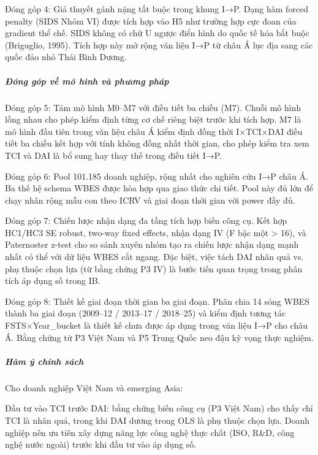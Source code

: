 \documentclass[12pt,a4paper]{article}
\begin{document}
Đóng góp 4: Giả thuyết gánh nặng tắt buộc trong khung I→P. Dạng hàm
forced penalty (SIDS Nhóm VI) được tích hợp vào H5 như trường hợp cực
đoan của gradient thể chế. SIDS không có chữ U ngược điển hình do quốc
tế hóa bắt buộc (Briguglio, 1995). Tích hợp này mở rộng văn liệu I→P từ
châu Á lục địa sang các quốc đảo nhỏ Thái Bình Dương.

\hypertarget{ux111uxf3ng-guxf3p-vux1ec1-muxf4-huxecnh-vuxe0-phux1b0ux1a1ng-phuxe1p}{%
\subparagraph{Đóng góp về mô hình và phương
pháp}\label{ux111uxf3ng-guxf3p-vux1ec1-muxf4-huxecnh-vuxe0-phux1b0ux1a1ng-phuxe1p}}

Đóng góp 5: Tám mô hình M0--M7 với điều tiết ba chiều (M7). Chuỗi mô
hình lồng nhau cho phép kiểm định từng cơ chế riêng biệt trước khi tích
hợp. M7 là mô hình đầu tiên trong văn liệu châu Á kiểm định đồng thời
I×TCI×DAI điều tiết ba chiều kết hợp với tính không đồng nhất thời gian,
cho phép kiểm tra xem TCI và DAI là bổ sung hay thay thế trong điều tiết
I→P.

Đóng góp 6: Pool 101.185 doanh nghiệp, rộng nhất cho nghiên cứu I→P châu
Á. Ba thế hệ schema WBES được hòa hợp qua giao thức chi tiết. Pool này
đủ lớn để chạy nhân rộng mẫu con theo ICRV và giai đoạn thời gian với
power đầy đủ.

Đóng góp 7: Chiến lược nhận dạng đa tầng tích hợp biến công cụ. Kết hợp
HC1/HC3 SE robust, two-way fixed effects, nhận dạng IV (F bậc một
\textgreater{} 16), và Paternoster z-test cho so sánh xuyên nhóm tạo ra
chiến lược nhận dạng mạnh nhất có thể với dữ liệu WBES cắt ngang. Đặc
biệt, việc tách DAI nhân quả vs. phụ thuộc chọn lựa (từ bằng chứng P3
IV) là bước tiến quan trọng trong phân tích áp dụng số trong IB.

Đóng góp 8: Thiết kế giai đoạn thời gian ba giai đoạn. Phân chia 14 sóng
WBES thành ba giai đoạn (2009--12 / 2013--17 / 2018--25) và kiểm định
tương tác FSTS×Year\_bucket là thiết kế chưa được áp dụng trong văn liệu
I→P cho châu Á. Bằng chứng từ P3 Việt Nam và P5 Trung Quốc neo đậu kỳ
vọng thực nghiệm.

\hypertarget{huxe0m-uxfd-chuxednh-suxe1ch}{%
\subparagraph{Hàm ý chính sách}\label{huxe0m-uxfd-chuxednh-suxe1ch}}

Cho doanh nghiệp Việt Nam và emerging Asia:

Đầu tư vào TCI trước DAI: bằng chứng biến công cụ (P3 Việt Nam) cho thấy
chỉ TCI là nhân quả, trong khi DAI dương trong OLS là phụ thuộc chọn
lựa. Doanh nghiệp nên ưu tiên xây dựng năng lực công nghệ thực chất
(ISO, R\&D, công nghệ nước ngoài) trước khi đầu tư vào áp dụng số.
\end{document}
